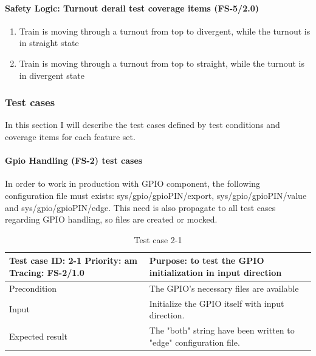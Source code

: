 \paragraph{Safety Logic: Turnout derail test coverage items (FS-5/2.0)}
\begin{enumerate}[label=FS-5/2.0-\arabic*, leftmargin=*, format=\small]
	\item Train is moving through a turnout from top to divergent, while the turnout is in straight state
	\item Train is moving through a turnout from top to straight, while the turnout is in divergent state
\end{enumerate}

\subsubsection{Test cases}\label{section:UnitTestCases}
In this section I will describe the test cases defined by test conditions and coverage items for each feature set.
\paragraph{Gpio Handling (FS-2) test cases} In order to work in production with GPIO component, the following configuration file must exists: sys/gpio/gpioPIN/export, sys/gpio/gpioPIN/value and sys/gpio/gpioPIN/edge. This need is also propagate to all test cases regarding GPIO handling, so files are created or mocked.
\begin{table}[H]
	\caption{Test case 2-1}
	\label{table:TCase-FS2-1}
	\begin{center}
		\renewcommand{\arraystretch}{1.8}
		\begin{tabu} 
			to 0.9 \textwidth
			{  X[0.4, c] X[c] }
			\toprule
			Test case ID: 2-1 \newline Priority: am \newline Tracing: FS-2/1.0 & Purpose: to test the GPIO initialization in input direction       \\ \midrule
			Precondition                                                       & The GPIO's necessary files are available                          \\
			Input                                                              & Initialize the GPIO itself with input direction.                  \\
			Expected result                                                    & The "both" string have been written to "edge" configuration file. \\ \bottomrule
		\end{tabu}
	\end{center}
\end{table} 

